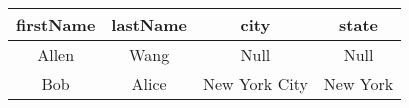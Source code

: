 \begin{tabular}{|c|c|c|c|}
    \hline
        \textbf{firstName} & \textbf{lastName} & \textbf{city} & \textbf{state} \\ \hline
        Allen & Wang & Null & Null \\ 
        Bob & Alice & New York City & New York \\ \hline
\end{tabular}
